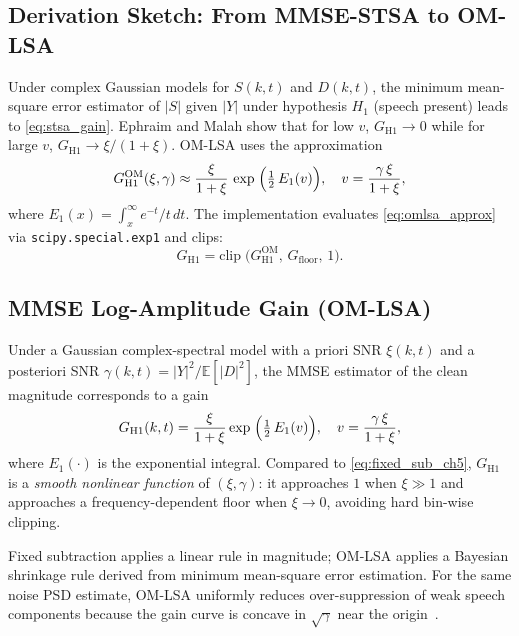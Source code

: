 \subsection{Derivation Sketch: From MMSE-STSA to OM-LSA}

Under complex Gaussian models for $S(k,t)$ and $D(k,t)$, the minimum mean-square error estimator of $|S|$ given $|Y|$ under hypothesis $H_1$ (speech present) leads to \eqref{eq:stsa_gain}. Ephraim and Malah show that for low $v$, $G_{\mathrm{H1}}\to 0$ while for large $v$, $G_{\mathrm{H1}}\to \xi/(1+\xi)$. OM-LSA uses the approximation~\cite{ephraim2005}
\begin{equation}
  G_{\mathrm{H1}}^{\mathrm{OM}}(\xi,\gamma) \approx \frac{\xi}{1+\xi}\,
  \exp\;\Bigl(\tfrac{1}{2}\,E_1(v)\Bigr), \quad v = \frac{\gamma\,\xi}{1+\xi},
  \label{eq:omlsa_approx}
\end{equation}
where $E_1(x)=\int_x^{\infty} e^{-t}/t\,dt$. The implementation evaluates \eqref{eq:omlsa_approx} via \texttt{scipy.special.exp1} and clips:
\begin{equation}
  G_{\mathrm{H1}} = \mathrm{clip}\;\bigl(G_{\mathrm{H1}}^{\mathrm{OM}},\, G_{\mathrm{floor}},\, 1\bigr).
  \label{eq:gh1_clip}
\end{equation}

\subsection{MMSE Log-Amplitude Gain (OM-LSA)}

Under a Gaussian complex-spectral model with a priori SNR $\xi(k,t)$ and a posteriori SNR $\gamma(k,t)=|Y|^2/\mathbb{E}[|D|^2]$, the MMSE estimator of the clean magnitude corresponds to a gain~\cite{ephraim1984,ephraim2005}
\begin{equation}
  G_{\mathrm{H1}}(k,t) = \frac{\xi}{1+\xi}\exp\;\Bigl(\tfrac{1}{2}\,E_1(v)\Bigr), \quad
  v = \frac{\gamma\,\xi}{1+\xi},
  \label{eq:omlsa_gain}
\end{equation}
where $E_1(\cdot)$ is the exponential integral. Compared to \eqref{eq:fixed_sub_ch5}, $G_{\mathrm{H1}}$ is a \emph{smooth nonlinear function} of $(\xi,\gamma)$: it approaches $1$ when $\xi\gg 1$ and approaches a frequency-dependent floor when $\xi\to 0$, avoiding hard bin-wise clipping.

\begin{remark}
Fixed subtraction applies a linear rule in magnitude; OM-LSA applies a Bayesian shrinkage rule derived from minimum mean-square error estimation. For the same noise PSD estimate, OM-LSA uniformly reduces over-suppression of weak speech components because the gain curve is concave in $\sqrt{\gamma}$ near the origin~\cite{loizou2013}.
\end{remark}

